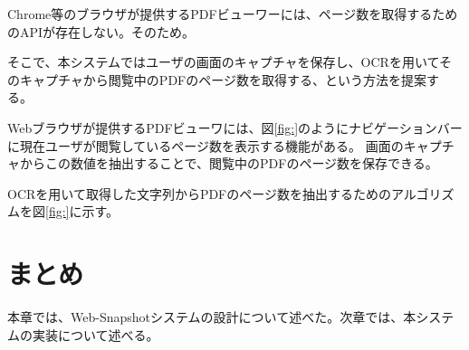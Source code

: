 Chrome等のブラウザが提供するPDFビューワーには、ページ数を取得するためのAPIが存在しない。そのため。

そこで、本システムではユーザの画面のキャプチャを保存し、OCRを用いてそのキャプチャから閲覧中のPDFのページ数を取得する、という方法を提案する。

Webブラウザが提供するPDFビューワには、図\ref{fig:}のようにナビゲーションバーに現在ユーザが閲覧しているページ数を表示する機能がある。
画面のキャプチャからこの数値を抽出することで、閲覧中のPDFのページ数を保存できる。

OCRを用いて取得した文字列からPDFのページ数を抽出するためのアルゴリズムを図\ref{fig:}に示す。

\section{まとめ}
本章では、Web-Snapshotシステムの設計について述べた。次章では、本システムの実装について述べる。
